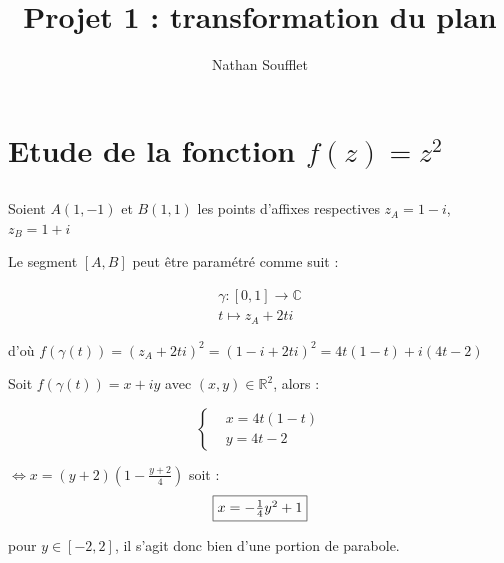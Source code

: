 \documentclass{article}
\begin{document}
        
        \title{Projet 1 : transformation du plan}
        \author{Nathan Soufflet}
    
        \maketitle
        \newpage
    
        \section{Etude de la fonction $f(z) = z^{2}$}
    
        \subsection{}

        Soient $A(1, -1)$ et $B(1, 1)$ les points d'affixes respectives $z_A = 1 - i$, $z_B = 1 + i$

        Le segment $[A, B]$ peut être paramétré comme suit :

        \begin{align*}
            \gamma : [0, 1] \to \mathbb{C} \\ t \mapsto z_A + 2ti
        \end{align*}

        d'où $f(\gamma(t)) = (z_A + 2ti)^{2} = (1 - i + 2ti)^{2} = 4t(1 - t) + i(4t - 2)$

        Soit $f(\gamma(t)) = x + iy$ avec $(x, y) \in \mathbb{R}^{2}$, alors : 
    
        \begin{equation*}
            \left \{
            \begin{aligned}
              &x = 4t(1 - t) \\
              &y = 4t - 2
            \end{aligned} \right.
        \end{equation*} 

          $\Leftrightarrow x = (y + 2)(1 - \frac{y + 2}{4})$ 
          soit : 
          $$\fbox{$x = -\frac{1}{4} y^2 + 1$}$$

          pour $y \in [-2, 2]$, il s'agit donc bien d'une portion de parabole.
\end{document}
